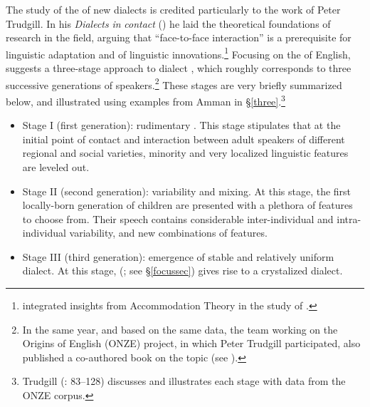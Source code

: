 \documentclass[output=paper]{langsci/langscibook}
\begin{document}
The study of the  of new dialects is credited particularly to the work of Peter Trudgill. In his \textit{Dialects} \textit{in} \textit{contact} (\citeyear{Trudgill1986}) he laid the theoretical foundations of research in the field, arguing that ``face-to-face interaction'' is a prerequisite for linguistic adaptation and  of linguistic innovations.\footnote{\citet{Trudgill1986} integrated insights from Accommodation Theory \citep{Giles1973} in the study of .} Focusing on the  of  {English}, \citet{Trudgill2004} suggests a three-stage approach to dialect , which roughly corresponds to three successive generations of speakers.\footnote{In the same year, and based on the same data, the team working on the Origins of {English} (ONZE) project, in which Peter Trudgill participated, also published a co-authored book on the topic (see \citealt{GordonEtAl2004}).} These stages are very briefly summarized below, and illustrated using examples from Amman in §\ref{three}.\footnote{Trudgill (\citeyear{Trudgill2004}: 83–128) discusses and illustrates each stage with data from the ONZE corpus.}

\begin{itemize}
    \item[] 
Stage I (first generation): rudimentary . This stage stipulates that at the initial point of contact and interaction between adult speakers of different regional and social varieties, minority and very localized linguistic features are leveled out.

\item[]
Stage II (second generation): variability and mixing. At this stage, the first locally-born generation of children are presented with a plethora of features to choose from. Their speech contains considerable inter-individual and intra-individual variability, and new combinations of features.

\item[] 
Stage III (third generation): emergence of stable and relatively uniform dialect. At this stage,  (\citealt{LePageTabouret-Keller1985}; see §\ref{focussec}) gives rise to a crystalized dialect. 
\end{itemize}
\end{document}
